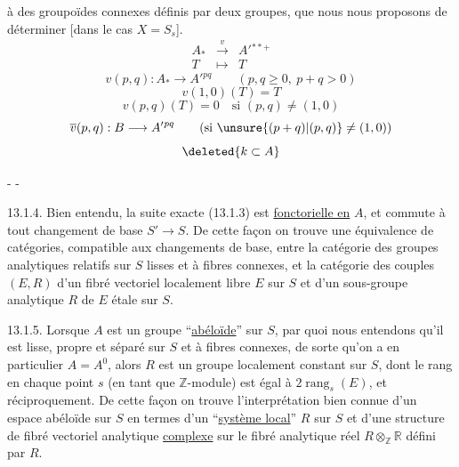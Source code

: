  à des groupoïdes connexes définis par deux groupes, que nous nous proposons de déterminer [dans le cas $X=S_s$].
\[
\begin{array}{rcl}A_*&\xrightarrow{v}&A'{}^{**+}\\T&\longmapsto&T\end{array}
\]
\[
v(p,q):A_*\longrightarrow A'{}^{pq}\qquad(p,q\geq0,\ p+q>0)
\]
\[
v(1,0)(T)=T
\]
\[
v(p,q)(T)=0\quad\text{si }(p,q)\neq(1,0)
\]
\[
\overline v(p,q):B\longrightarrow A'{}^{pq}\qquad\text{(si }\unsure{(p+q)|(p,q)}\neq(1,0)\text{)}
\]
\[\deleted{k\subset A}\]

\begin{center}-  -\end{center}
13.1.4. Bien entendu, la suite exacte (13.1.3) est \uline{fonctorielle en} $A$, et commute à tout changement de base $S'\longrightarrow S$. De cette façon on trouve une équivalence de catégories, compatible aux changements de base, entre la catégorie des groupes analytiques relatifs sur $S$ lisses et à fibres connexes, et la catégorie des couples $(E,R)$ d'un fibré vectoriel localement libre $E$ sur $S$ et d'un sous-groupe analytique $R$ de $E$ étale sur $S$.

13.1.5. Lorsque $A$ est un groupe ``\uline{abéloïde}'' sur $S$, par quoi nous entendons qu'il est lisse, propre et séparé sur $S$ et à fibres connexes, de sorte qu'on a en particulier $A=A^0$, alors $R$ est un groupe localement constant sur $S$, dont le rang en chaque point $s$ (en tant que $\mathbb Z$-module) est égal à $2\operatorname{rang}_s(E)$, et réciproquement. De cette façon on trouve l'interprétation bien connue d'un espace abéloïde sur $S$ en termes d'un ``\uline{système local}'' $R$ sur $S$ et d'une structure de fibré vectoriel analytique \uline{complexe} sur le fibré analytique réel $R\otimes_{\mathbb Z}\mathbb R$ défini par $R$.


